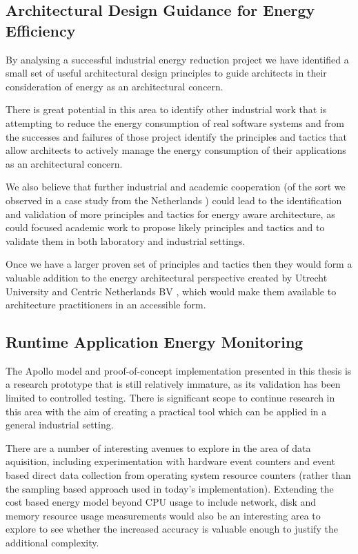 \subsection{Architectural Design Guidance for Energy Efficiency}

By analysing a successful industrial energy reduction project we have identified a small set of useful architectural design principles to guide architects in their consideration of energy as an architectural concern.  

There is great potential in this area to identify other industrial work that is attempting to reduce the energy consumption of real software systems and from the successes and failures of those project identify the principles and tactics that allow architects to actively manage the energy consumption of their applications as an architectural concern.  

We also believe that further industrial and academic cooperation (of the sort we observed in a case study from the Netherlands \cite{jagroep2016-comparingreleases}) could lead to the identification and validation of more principles and tactics for energy aware architecture, as could focused academic work to propose likely principles and tactics and to validate them in both laboratory and industrial settings.

Once we have a larger proven set of principles and tactics then they would form a valuable addition to the energy architectural perspective created by Utrecht University and Centric Netherlands BV \cite{jagroep2017-energyperspective}, which would make them available to architecture practitioners in an accessible form.

\subsection{Runtime Application Energy Monitoring}

The Apollo model and proof-of-concept implementation presented in this thesis is a research prototype that is still relatively immature, as its validation has been limited to controlled testing.  There is significant scope to continue research in this area with the aim of creating a practical tool which can be applied in a general industrial setting.

There are a number of interesting avenues to explore in the area of data aquisition, including experimentation with hardware event counters and event based direct data collection from operating system resource counters (rather than the sampling based approach used in today's implementation).  Extending the cost based energy model beyond CPU usage to include network, disk and memory resource usage measurements would also be an interesting area to explore to see whether the increased accuracy is valuable enough to justify the additional complexity.

